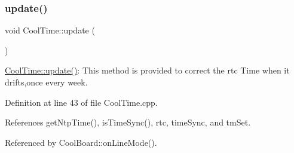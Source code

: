 \subsubsection{\texorpdfstring{update()}{update()}}
{\footnotesize\ttfamily void Cool\+Time\+::update (\begin{DoxyParamCaption}{ }\end{DoxyParamCaption})}

\hyperlink{classCoolTime_aae601f795452cfa48d9fb337aed483a8}{Cool\+Time\+::update()}\+: This method is provided to correct the rtc Time when it drifts,once every week. 

Definition at line 43 of file Cool\+Time.\+cpp.



References get\+Ntp\+Time(), is\+Time\+Sync(), rtc, time\+Sync, and tm\+Set.



Referenced by Cool\+Board\+::on\+Line\+Mode().


